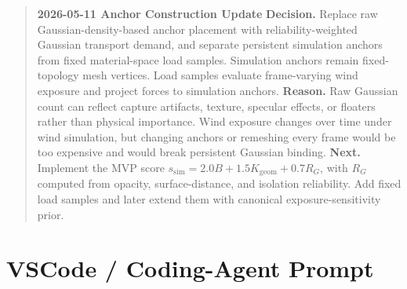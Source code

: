 \documentclass[11pt,a4paper]{article}
\begin{document}
\begin{quote}
\textbf{2026-05-11 Anchor Construction Update}\newline
\textbf{Decision.} Replace raw Gaussian-density-based anchor placement with reliability-weighted Gaussian transport demand, and separate persistent simulation anchors from fixed material-space load samples. Simulation anchors remain fixed-topology mesh vertices. Load samples evaluate frame-varying wind exposure and project forces to simulation anchors.\newline
\textbf{Reason.} Raw Gaussian count can reflect capture artifacts, texture, specular effects, or floaters rather than physical importance. Wind exposure changes over time under wind simulation, but changing anchors or remeshing every frame would be too expensive and would break persistent Gaussian binding.\newline
\textbf{Next.} Implement the MVP score $s_{\mathrm{sim}}=2.0B+1.5K_{\mathrm{geom}}+0.7R_G$, with $R_G$ computed from opacity, surface-distance, and isolation reliability. Add fixed load samples and later extend them with canonical exposure-sensitivity prior.
\end{quote}

\section{VSCode / Coding-Agent Prompt}
\end{document}
